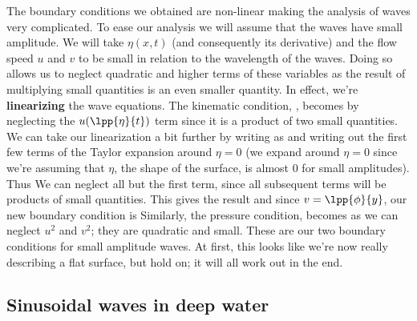 \documentclass[12pt]{book}
\begin{document}
The boundary conditions we obtained are non-linear making the analysis of waves very complicated.  To ease our analysis we will assume that the waves have small amplitude.  We will take $\eta(x,t)$ (and consequently its derivative) and the flow speed $u$ and $v$ to be small in relation to the wavelength of the waves.  Doing so allows us to neglect quadratic and higher terms of these variables as the result of multiplying small quantities is an even smaller quantity.  In effect, we're \textbf{linearizing} the wave equations.  The kinematic condition, , becomes 
by neglecting the $u(\lpp{\eta}{t})$ term since it is a product of two small quantities. We can take our linearization a bit further by writing  as
and writing out the first few terms of the Taylor expansion around $\eta = 0$ (we expand around $\eta=0$ since we're assuming that $\eta$, the shape of the surface, is almost $0$ for small amplitudes).  Thus
We can neglect all but the first term, since all subsequent terms will be products of small quantities.  This gives the result
 and since $v = \lpp{\phi}{y}$, our new boundary condition is
  Similarly, the pressure condition,  becomes
 as we can neglect $u^2$ and $v^2$; they are quadratic and small.  These are our two boundary conditions for small amplitude waves.  At first, this looks like we're now really describing a flat surface, but hold on; it will all work out in the end.






\subsection{Sinusoidal waves in deep water}
\end{document}
